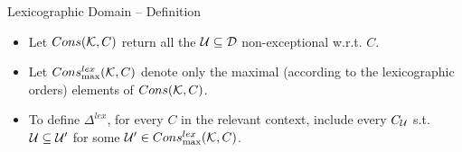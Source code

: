 \documentclass[10pt]{beamer}
\begin{document}
\begin{frame}[fragile]{Lexicographic Domain -- Definition}
  \begin{itemize}
    \item Let $Cons(\mathcal{K}, C)$ return all the $\mathcal{U} \subseteq \mathcal{D}$ non-exceptional w.r.t. $C$. \pause 
    \item Let $Cons^{lex}_{\max}(\mathcal{K}, C)$ denote only the maximal (according to the lexicographic orders) elements of $Cons(\mathcal{K}, C)$.
    \item To define $\Delta^{lex}$, for every $C$ in the relevant context, include every ${C}_{\mathcal{U}}$ s.t. $\mathcal{U} \subseteq \mathcal{U}'$ for some $\mathcal{U}' \in Cons^{lex}_{\max}(\mathcal{K}, C)$.
  \end{itemize}
\end{frame}


\end{document}
